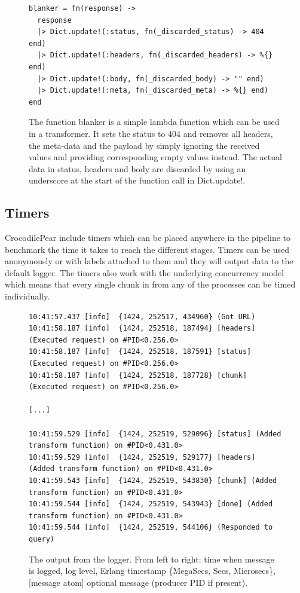 \documentclass{cslthse-msc}
\begin{document}
\begin{figure}[H]
  \centering
\begin{lstlisting}[breaklines=true,frame=single]
blanker = fn(response) ->
  response
  |> Dict.update!(:status, fn(_discarded_status) -> 404 end)
  |> Dict.update!(:headers, fn(_discarded_headers) -> %{} end)
  |> Dict.update!(:body, fn(_discarded_body) -> "" end)
  |> Dict.update!(:meta, fn(_discarded_meta) -> %{} end)
end
\end{lstlisting}
  \caption{The function blanker is a simple lambda function which can be used in a transformer. It sets the status to 404 and removes all headers, the meta-data and the payload by simply ignoring the received values and providing corresponding empty values instead. The actual data in status, headers and body are discarded by using an underscore at the start of the function call in Dict.update!.}
\end{figure}

\subsection{Timers}
CrocodilePear include timers which can be placed anywhere in the pipeline to benchmark the time it takes to reach the different stages. Timers can be used anonymously or with labels attached to them and they will output data to the default logger. The timers also work with the underlying concurrency model which means that every single chunk in from any of the processes can be timed individually.

\begin{figure}[H]
  \centering
\begin{lstlisting}[breaklines=true,frame=single]
10:41:57.437 [info]  {1424, 252517, 434960} (Got URL)
10:41:58.187 [info]  {1424, 252518, 187494} [headers] (Executed request) on #PID<0.256.0>
10:41:58.187 [info]  {1424, 252518, 187591} [status] (Executed request) on #PID<0.256.0>
10:41:58.187 [info]  {1424, 252518, 187728} [chunk] (Executed request) on #PID<0.256.0>

[...]

10:41:59.529 [info]  {1424, 252519, 529096} [status] (Added transform function) on #PID<0.431.0>
10:41:59.529 [info]  {1424, 252519, 529177} [headers] (Added transform function) on #PID<0.431.0>
10:41:59.543 [info]  {1424, 252519, 543830} [chunk] (Added transform function) on #PID<0.431.0>
10:41:59.544 [info]  {1424, 252519, 543943} [done] (Added transform function) on #PID<0.431.0>
10:41:59.544 [info]  {1424, 252519, 544106} (Responded to query)
\end{lstlisting}
  \caption{The output from the logger. From left to right: time when message is logged, log level, Erlang timestamp \{MegaSecs, Secs, Microsecs\}, [message atom] optional message (producer PID if present).}
\end{figure}
\end{document}
